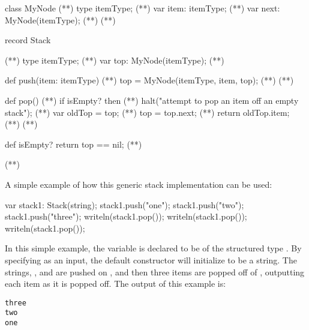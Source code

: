 \begin{numberedchapel}
class MyNode {                      (*\label{mynode_class_start}*)
  type itemType;                    (*\label{mynode_itemtype}*)
  var item: itemType;               (*\label{mynode_item}*)
  var next: MyNode(itemType);       (*\label{mynode_next}*)
}                                   (*\label{mynode_class_end}*)

record Stack {                      (*\label{stack_list_start}*)
  type itemType;                    (*\label{stack_list_itemtype}*)
  var top: MyNode(itemType);        (*\label{stack_list_top}*)

  def push(item: itemType) {        (*\label{stack_list_push_start}*)
    top = MyNode(itemType, item, top); (*\label{stack_list_push_top}*)
  }                                 (*\label{stack_list_push_end}*)

  def pop() {                       (*\label{stack_list_pop_start}*)
    if isEmpty? then                (*\label{stack_list_pop_empty_1}*)
      halt("attempt to pop an item off an empty stack"); (*\label{stack_list_empty_2}*)
    var oldTop = top;               (*\label{stack_list_pop_oldtop}*)
    top = top.next;                 (*\label{stack_list_pop_newtop}*)
    return oldTop.item;             (*\label{stack_list_pop_return}*)
  }                                 (*\label{stack_list_pop_end}*)

  def isEmpty? return top == nil;   (*\label{stack_list_isempty}*)
}                                  (*\label{stack_list_end}*)
\end{numberedchapel}

A simple example of how this generic stack implementation can be used:
\begin{chapel}
var stack1: Stack(string);
stack1.push("one");
stack1.push("two");
stack1.push("three");
writeln(stack1.pop());
writeln(stack1.pop());
writeln(stack1.pop());
\end{chapel}
In this simple example, the variable  is declared to be of the structured 
type .  By specifying  as an input, the default constructor
will initialize  to be a string.  
The strings, ,  and 
are pushed on , and then three items are popped off of ,
outputting each item as it is popped off. The output of this example is:
\small{
\begin{verbatim}
three
two
one
\end{verbatim}}

